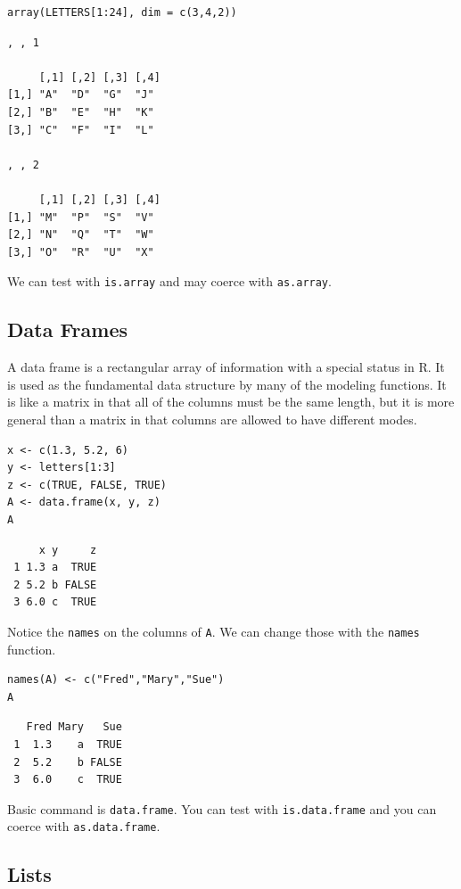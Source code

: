\documentclass[captions=tableheading]{scrbook}
\begin{document}
\begin{verbatim}
array(LETTERS[1:24], dim = c(3,4,2))
\end{verbatim}


\begin{verbatim}
, , 1

     [,1] [,2] [,3] [,4]
[1,] "A"  "D"  "G"  "J" 
[2,] "B"  "E"  "H"  "K" 
[3,] "C"  "F"  "I"  "L" 

, , 2

     [,1] [,2] [,3] [,4]
[1,] "M"  "P"  "S"  "V" 
[2,] "N"  "Q"  "T"  "W" 
[3,] "O"  "R"  "U"  "X"
\end{verbatim}

We can test with \texttt{is.array} and may coerce with \texttt{as.array}.
\subsection{Data Frames}
\label{sec-20-1-3}


A data frame is a rectangular array of information with a special status in \textsf{R}. It is used as the fundamental data structure by many of the modeling functions. It is like a matrix in that all of the columns must be the same length, but it is more general than a matrix in that columns are allowed to have different modes.


\begin{verbatim}
x <- c(1.3, 5.2, 6)
y <- letters[1:3]
z <- c(TRUE, FALSE, TRUE)
A <- data.frame(x, y, z)
A
\end{verbatim}

\begin{verbatim}
     x y     z
 1 1.3 a  TRUE
 2 5.2 b FALSE
 3 6.0 c  TRUE
\end{verbatim}

Notice the \texttt{names} on the columns of \texttt{A}. We can change those with the \texttt{names} function.


\begin{verbatim}
names(A) <- c("Fred","Mary","Sue")
A
\end{verbatim}

\begin{verbatim}
   Fred Mary   Sue
 1  1.3    a  TRUE
 2  5.2    b FALSE
 3  6.0    c  TRUE
\end{verbatim}

Basic command is \texttt{data.frame}. You can test with \texttt{is.data.frame} and you can coerce with \texttt{as.data.frame}.
\subsection{Lists}
\label{sec-20-1-4}
\end{document}
